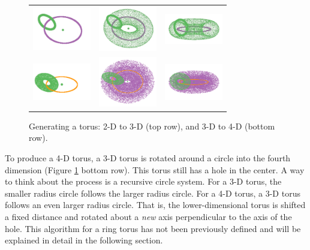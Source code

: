 \begin{figure}[ht]
\centering
\begin{tabular}{c c c}
\includegraphics[width=1in]{fig/torus-ring-3-2nd-1.pdf} & \includegraphics[width=1in]{fig/torus-ring-3-2nd-2.pdf} & \includegraphics[width=1in]{fig/torus-ring-3-2nd-3.pdf}   \\ \includegraphics[width=1in]{fig/torus-rings-4-2.pdf} &\includegraphics[width=1in]{fig/torus-rings-4-with-torus-2.pdf}&\includegraphics[width=1in]{fig/torus-rings-4-with-torus-1.pdf}
\end{tabular}
\caption{Generating a torus: 2-D to 3-D (top row), and 3-D to 4-D (bottom row).}
\label{ringtorus}
\end{figure}

To produce a 4-D torus, a 3-D torus is rotated around a circle into
the fourth dimension (Figure \ref{ringtorus} bottom row).  This torus
still has a hole in the center.  A way to think about the process is a
recursive circle system. For a 3-D torus, the smaller radius circle
follows the larger radius circle. For a 4-D torus, a 3-D torus follows an even
larger radius circle.  That is, the lower-dimensional torus is
shifted a fixed distance and rotated about a \textit{new} axis
perpendicular to the axis of the hole. This algorithm for a ring torus has not been
previously defined and will be explained in detail in the following section.

